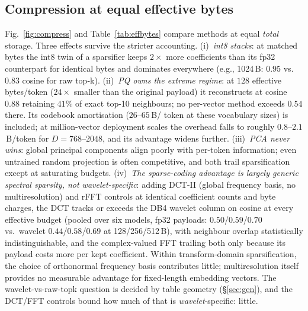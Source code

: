 \documentclass[conference]{IEEEtran}
\begin{document}


\subsection{Compression at equal effective bytes}
\label{sec:compress}
Fig.~\ref{fig:compress} and Table~\ref{tab:effbytes} compare methods at
equal \emph{total} storage. Three effects survive the stricter
accounting.
(i)~\emph{int8 stacks}: at matched bytes the int8 twin of a
sparsifier keeps $2\times$ more coefficients than its fp32 counterpart
for identical bytes and dominates everywhere
(e.g., 1024\,B: $0.95$ vs.\ $0.83$ cosine for raw top-k).
(ii)~\emph{PQ owns the extreme regime}: at $128$ effective bytes/token
($24\times$ smaller than the original payload) it reconstructs at
cosine $0.88$ retaining $41$\% of exact top-10 neighbours; no per-vector
method exceeds $0.54$ there. Its codebook amortisation ($26$--$65$\,B/
token at these vocabulary sizes) is included; at million-vector
deployment scales the overhead falls to roughly $0.8$--$2.1$\,B/token
for $D{=}768$--$2048$, and its advantage widens further.
(iii)~\emph{PCA never wins}: global principal components align poorly
with per-token information; even untrained random projection is often
competitive, and both trail sparsification except at saturating budgets.
(iv)~\emph{The sparse-coding advantage is largely generic spectral
sparsity, not wavelet-specific}: adding DCT-II (global frequency basis,
no multiresolution) and rFFT controls at identical coefficient counts
and byte charges, the DCT tracks or exceeds the DB4 wavelet column on
cosine at every effective budget (pooled over six models, fp32
payloads: $0.50$/$0.59$/$0.70$ vs.\ wavelet $0.44$/$0.58$/$0.69$ at
128/256/512\,B), with neighbour overlap statistically indistinguishable,
and the complex-valued FFT trailing both only because its payload costs
more per kept coefficient. Within transform-domain sparsification, the
choice of orthonormal frequency basis contributes little; multiresolution
itself provides no measurable advantage for fixed-length embedding
vectors.
The wavelet-vs-raw-topk question is decided by table geometry
(\S\ref{sec:gen}), and the DCT/FFT controls bound how much of that is
\emph{wavelet}-specific: little.
\end{document}
